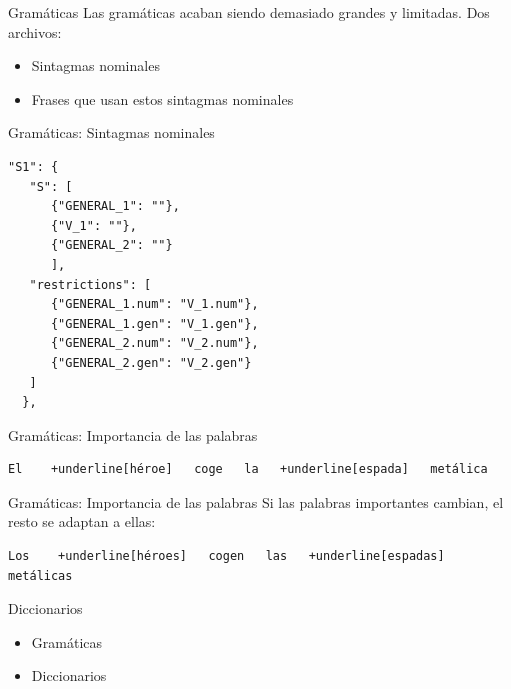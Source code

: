 \begin{frame}[t, fragile]{Gramáticas}
	Las gramáticas acaban siendo demasiado grandes y limitadas. Dos archivos:
	\begin{itemize}
		\item Sintagmas nominales
		\item<+-| alert@+> Frases que usan estos sintagmas nominales
	\end{itemize}
\end{frame}

\begin{frame}[t, fragile]{Gramáticas: Sintagmas nominales}
	\begin{Verbatim}
"S1": {
   "S": [
      {"GENERAL_1": ""},
      {"V_1": ""},
      {"GENERAL_2": ""}
      ],
   "restrictions": [
      {"GENERAL_1.num": "V_1.num"},
      {"GENERAL_1.gen": "V_1.gen"},
      {"GENERAL_2.num": "V_2.num"},
      {"GENERAL_2.gen": "V_2.gen"}
   ]
  },
	\end{Verbatim}
\end{frame}

\begin{frame}[t, fragile]{Gramáticas: Importancia de las palabras}
	\vspace*{\fill}
		\begin{Verbatim}[commandchars=+\[\]]
El    +underline[héroe]   coge   la   +underline[espada]   metálica
		\end{Verbatim}
	\vspace*{\fill}
\end{frame}

\begin{frame}[t, fragile]{Gramáticas: Importancia de las palabras}
	Si las palabras importantes cambian, el resto se adaptan a ellas:
	\vspace*{\fill}
		\begin{Verbatim}[commandchars=+\[\]]
Los    +underline[héroes]   cogen   las   +underline[espadas]   metálicas
		\end{Verbatim}
	\vspace*{\fill}
\end{frame}


\begin{tframe}{Diccionarios}
	\begin{itemize}
		\item Gramáticas
		\item<+-| alert@+> Diccionarios
	\end{itemize}
\end{tframe}

